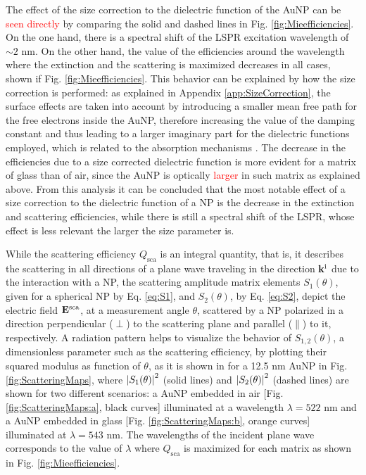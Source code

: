 The effect of the size correction to the dielectric function of the AuNP can be \textcolor{red}{seen directly} by comparing the solid and dashed lines in Fig. \ref{fig:Mieefficiencies}. On the one hand, there is a spectral shift of the LSPR excitation wavelength  of $\sim 2$ nm. On the other hand, the value of the efficiencies around the wavelength where the extinction and the scattering is maximized decreases in all cases, shown if Fig. \ref{fig:Mieefficiencies}.  This behavior can be explained by how the size correction is performed: as explained in Appendix \ref{app:SizeCorrection}, the surface effects are taken into account by introducing a smaller mean free path for the free electrons inside the AuNP, therefore increasing the value of the damping constant and thus leading to a larger imaginary part for the dielectric functions employed, which is related to the absorption mechanisms \cite{ibach_solid-state_2009}. The decrease in the efficiencies due to a size corrected dielectric function is more evident for a matrix of glass than of air, since the AuNP is optically \textcolor{red}{larger} in such matrix as explained above.  From this analysis it can be concluded that the most notable effect of a size correction to the dielectric function of a NP is the decrease in the extinction and scattering efficiencies, while there is still a spectral shift of the LSPR, whose effect is less relevant the larger the size parameter is.

While the scattering efficiency $Q_\text{sca}$ is an integral quantity, that is, it describes the scattering in all directions of a plane wave traveling in the  direction $\vb{k}^\text{i}$ due to the interaction with a NP, the scattering amplitude matrix elements $S_1(\theta)$,  given  for a spherical NP by Eq. \eqref{eq:S1}, and  $S_2(\theta)$, by Eq. \eqref{eq:S2}, depict the  electric field $\vb{E}^\text{sca}$, at a measurement angle $\theta$,  scattered by a NP polarized in a direction perpendicular ($\perp$) to the scattering plane and parallel ($\parallel$) to it, respectively. A radiation pattern helps to visualize the behavior of $S_{1,2}(\theta)$, a dimensionless parameter such as the scattering efficiency, by plotting their squared modulus as function of $\theta$, as it is shown in for a 12.5 nm AuNP in Fig. \ref{fig:ScatteringMaps}, where $\abs{S_{1}(\theta)}^2$ (solid lines) and $\abs{S_2(\theta)}^2$ (dashed lines) are shown for two different scenarios: a AuNP embedded in air [Fig. \ref{fig:ScatteringMaps:a}, black curves]  illuminated  at a wavelength $\lambda = 522$ nm and a AuNP embedded in glass  [Fig. \ref{fig:ScatteringMaps:b}, orange curves]  illuminated at $\lambda = 543$ nm. The wavelengths of the incident plane wave corresponds to the value of $\lambda$ where $Q_\text{sca}$ is maximized for each matrix as shown in Fig. \ref{fig:Mieefficiencies}.

